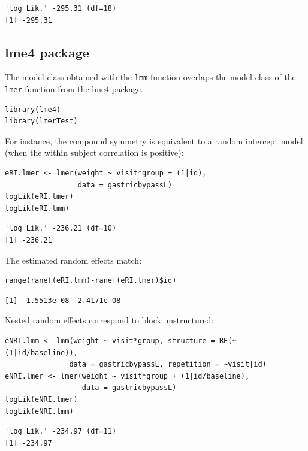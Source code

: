 \documentclass[12pt]{article}
\begin{document}
\begin{verbatim}
'log Lik.' -295.31 (df=18)
[1] -295.31
\end{verbatim}


\clearpage

\subsection{lme4 package}
\label{sec:org5ac3e46}

The model class obtained with the \texttt{lmm} function overlaps the model
class of the \texttt{lmer} function from the lme4 package.
\lstset{language=r,label= ,caption= ,captionpos=b,numbers=none}
\begin{lstlisting}
library(lme4)
library(lmerTest)
\end{lstlisting}

For instance, the compound symmetry is equivalent to a random
intercept model (when the within subject correlation is positive):
\lstset{language=r,label= ,caption= ,captionpos=b,numbers=none}
\begin{lstlisting}
eRI.lmer <- lmer(weight ~ visit*group + (1|id),
                 data = gastricbypassL)
logLik(eRI.lmer)
logLik(eRI.lmm)
\end{lstlisting}

\begin{verbatim}
'log Lik.' -236.21 (df=10)
[1] -236.21
\end{verbatim}


The estimated random effects match:
\lstset{language=r,label= ,caption= ,captionpos=b,numbers=none}
\begin{lstlisting}
range(ranef(eRI.lmm)-ranef(eRI.lmer)$id)
\end{lstlisting}

\begin{verbatim}
[1] -1.5513e-08  2.4171e-08
\end{verbatim}


Nested random effects correspond to block unstructured:
\lstset{language=r,label= ,caption= ,captionpos=b,numbers=none}
\begin{lstlisting}
eNRI.lmm <- lmm(weight ~ visit*group, structure = RE(~(1|id/baseline)),
               data = gastricbypassL, repetition = ~visit|id)
eNRI.lmer <- lmer(weight ~ visit*group + (1|id/baseline),
                  data = gastricbypassL)
logLik(eNRI.lmer)
logLik(eNRI.lmm)
\end{lstlisting}

\begin{verbatim}
'log Lik.' -234.97 (df=11)
[1] -234.97
\end{verbatim}
\end{document}

